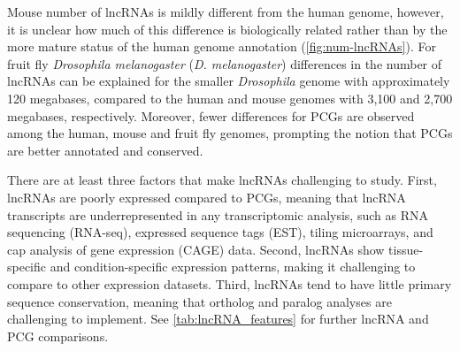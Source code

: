 Mouse number of lncRNAs is mildly different from the human genome, however, it is unclear how much of this difference is biologically related rather than by the more mature status of the human genome annotation (\autoref{fig:num-lncRNAs}). For fruit fly \textit{Drosophila melanogaster} (\textit{D. melanogaster}) differences in the number of lncRNAs can be explained for the smaller \textit{Drosophila} genome with approximately 120 megabases, compared to the human and mouse genomes with 3,100 and 2,700 megabases,\autocite{adams_2000_dme_genome} respectively. Moreover, fewer differences for PCGs are observed among the human, mouse and fruit fly genomes, prompting the notion that PCGs are better annotated and conserved. 

There are at least three factors that make lncRNAs challenging to study. First, lncRNAs are poorly expressed compared to PCGs, meaning that lncRNA transcripts are underrepresented in any transcriptomic analysis, such as RNA sequencing (RNA-seq), expressed sequence tags (EST), tiling microarrays, and cap analysis of gene expression (CAGE) data.\autocite{uszczynska2018,derrien_2012_gencode} Second, lncRNAs show tissue-specific and condition-specific expression patterns, making it challenging to compare to other expression datasets.\autocite{djebali_2012_landscape,kopp_2018_functional} Third, lncRNAs tend to have little primary sequence conservation, meaning that ortholog and paralog analyses are challenging to implement.\autocite{zhao_2021_noncodev6,frankish_2021_gencode} See \autoref{tab:lncRNA_features} for further lncRNA and PCG comparisons. 

